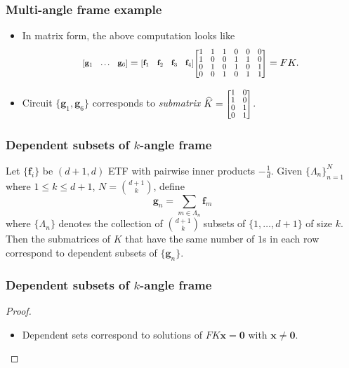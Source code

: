 \documentclass{beamer}
\renewcommand{\vec}[1]{\mathbf{#1}}
\newcommand{\ivec}[2][.8]{%
  \scalebox{#1}{%
    \renewcommand{\arraystretch}{.8}%
    $\begin{bmatrix}#2\end{bmatrix}$%
  }
}
\begin{document}
{\begin{frame}
    \frametitle{Multi-angle frame example}
    \begin{itemize}
    \item <1-> In matrix form, the above computation looks like
    \[
    \ivec{\vec{g}_1 & \ldots & \vec{g}_6}
    = \ivec{\vec{f}_1 & \vec{f}_2 & \vec{f}_3 & \vec{f}_4}\ivec{1 & 1 & 1 & 0 & 0 & 0\\ 1 & 0 & 0 & 1 & 1 & 0 \\ 0 & 1 & 0 & 1 & 0 & 1 \\ 0 & 0 & 1 & 0 & 1 & 1} = FK.
    \]
    \item <2-> Circuit $\{\vec{g}_1, \vec{g}_6\}$ corresponds to \textit{submatrix} $\widehat{K} = \ivec{1 & 0 \\ 1 & 0 \\ 0 & 1 \\ 0 & 1}$.
    \end{itemize}
\end{frame}

\begin{frame}
    \frametitle{Dependent subsets of $k$-angle frame}
    \begin{theorem}
        Let $\{\vec{f}_i\}$ be $(d+1,d)$ ETF with pairwise inner products $-\frac{1}{d}$.
        Given $\{\Lambda_n\}_{n=1}^{N}$ where $1\leq k\leq d+1$, $N = \binom{d+1}{k}$, define
        \[
            \vec{g}_n = \sum_{m\in\Lambda_n}\vec{f}_m
        \]
        where $\{\Lambda_n\}$ denotes the collection of $\binom{d+1}{k}$ subsets of $\{1,\ldots, d+1\}$ of size $k$.
        Then the submatrices of $K$ that have the same number of $1$s in each row correspond to dependent subsets of $\{\vec{g}_n\}$.
    \end{theorem}
\end{frame}
\begin{frame}
    \frametitle{Dependent subsets of $k$-angle frame}
    \begin{proof}
        \begin{itemize}

            \item <1-> Dependent sets correspond to solutions of $FK\vec{x} = \vec{0}$ with $\vec{x}\neq\vec{0}$.


\end{itemize}
\end{proof}
\end{frame}}
\end{document}
